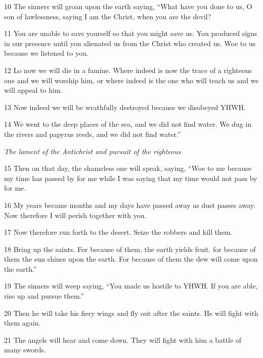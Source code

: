 \par 10 The sinners will groan upon the earth saying, “What have you done to us, O son of lawlessness, saying I am the Christ, when you are the devil?

\par 11 You are unable to save yourself so that you might save us. You produced signs in our presence until you alienated us from the Christ who created us. Woe to us because we listened to you.

\par 12 Lo now we will die in a famine. Where indeed is now the trace of a righteous one and we will worship him, or where indeed is the one who will teach us and we will appeal to him.

\par 13 Now indeed we will be wrathfully destroyed because we disobeyed YHWH.

\par 14 We went to the deep places of the sea, and we did not find water. We dug in the rivers and papyrus reeds, and we did not find water.”


\par \textit{The lament of the Antichrist and pursuit of the righteous}


\par 15 Then on that day, the shameless one will speak, saying, “Woe to me because my time has passed by for me while I was saying that my time would not pass by for me.

\par 16 My years became months and my days have passed away as dust passes away. Now therefore I will perish together with you.

\par 17 Now therefore run forth to the desert. Seize the robbers and kill them.

\par 18 Bring up the saints. For because of them, the earth yields fruit. for because of them the sun shines upon the earth. For because of them the dew will come upon the earth.”

\par 19 The sinners will weep saying, “You made us hostile to YHWH. If you are able, rise up and pursue them.”

\par 20 Then he will take his fiery wings and fly out after the saints. He will fight with them again.

\par 21 The angels will hear and come down. They will fight with him a battle of many swords.

